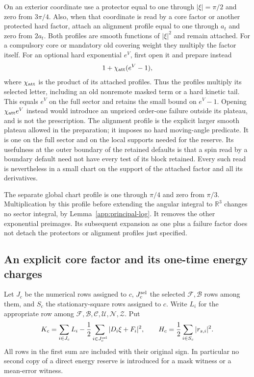 On an exterior coordinate use a protector equal to one through
$|\xi|=\pi/2$ and zero from $3\pi/4$.  Also, when that coordinate is
read by a core factor or another protected hard factor, attach an
alignment profile equal to one through $a_t$ and zero from $2a_t$.
Both profiles are smooth functions of $|\xi|^2$ and remain attached.
For a compulsory core or mandatory old covering weight they multiply
the factor itself.  For an optional hard exponential $e^V$, first open
it and prepare instead
\[
 1+\chi_{\rm att}(e^V-1),
\]
where $\chi_{\rm att}$ is the product of its attached profiles.
Thus the profiles multiply its selected letter, including an old
nonremote masked term or a hard kinetic tail.  This equals $e^V$ on
the full sector and retains the small bound on $e^V-1$.
Opening $\chi_{\rm att}e^V$ instead would introduce an unpriced
order-one failure outside its plateau, and is not the prescription.
The alignment profile is the explicit larger smooth
plateau allowed in the preparation; it imposes no hard moving-angle
predicate.  It is one on the full sector and on the local supports needed
for the reserve.  Its usefulness at the outer boundary of the retained
defaults is that a spin read by a boundary default need not have every
test of its block retained.  Every such read is nevertheless in a small
chart on the support of the attached factor and all its derivatives.

The separate global chart profile is one through $\pi/4$ and zero
from $\pi/3$.  Multiplication by this profile before extending the
angular integral to $\mathbb R^3$ changes no sector integral, by
Lemma~\ref{app:principal-log}.  It removes the other exponential
preimages.  Its subsequent expansion as one plus a failure factor does
not detach the protectors or alignment profiles just specified.

\subsection{An explicit core factor and its one-time energy charges}

Let $J_c$ be the numerical rows assigned to $c$, $J_c^{\rm sel}$
the selected $\mathcal F,\mathcal B$ rows among them, and $S_c$ the
stationary-square rows assigned to $c$.  Write $L_i$ for the appropriate
row among $\mathcal F,\mathcal B,\mathcal C,\mathcal U,\mathcal N,
\mathcal Z$.  Put
\[
 K_c=\sum_{i\in J_c}L_i
      -\frac12\sum_{i\in J_c^{\rm sel}}|D_i\xi+F_i|^2,
 \qquad
 H_c=\frac12\sum_{i\in S_c}|r_{s,i}|^2.
\]
All rows in the first sum are included with their original sign.
In particular no second copy of a direct energy reserve is introduced
for a mask witness or a mean-error witness.


